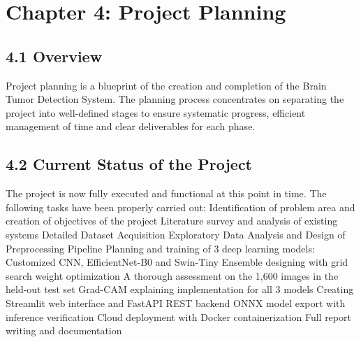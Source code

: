 \documentclass[12pt,a4paper,oneside]{report}
\begin{document}
\chapter{Chapter 4: Project Planning}
\section{4.1 Overview}
Project planning is a blueprint of the creation and completion of the Brain Tumor Detection System. The planning process concentrates on separating the project into well-defined stages to ensure systematic progress, efficient management of time and clear deliverables for each phase.
\section{4.2 Current Status of the Project}
The project is now fully executed and functional at this point in time. The following tasks have been properly carried out:
Identification of problem area and creation of objectives of the project
Literature survey and analysis of existing systems
Detailed Dataset Acquisition Exploratory Data Analysis and Design of Preprocessing Pipeline
Planning and training of 3 deep learning models: Customized CNN, EfficientNet-B0 and Swin-Tiny
Ensemble designing with grid search weight optimization
A thorough assessment on the 1,600 images in the held-out test set
Grad-CAM explaining implementation for all 3 models
Creating Streamlit web interface and FastAPI REST backend
ONNX model export with inference verification 
Cloud deployment with Docker containerization
Full report writing and documentation
\end{document}
